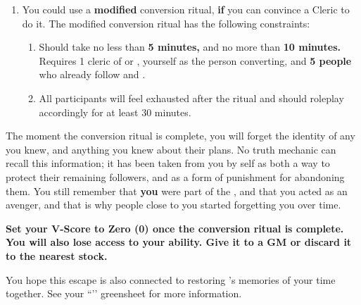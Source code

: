 \documentclass[green]{GL2020}
\begin{document}
\begin{enumerate}
\begin{enumerate}
\begin{enumerate}
    \end{enumerate}
    \item You could use a \textbf{modified} conversion ritual, \textbf{if} you can convince a Cleric to do it. The modified conversion ritual has the following constraints:
    \begin{enumerate}
      \item Should take no less than \textbf{5 minutes,} and no more than \textbf{10 minutes.} Requires 1 cleric of \cEbb{} or \cFlow{}, yourself as the person converting, and \textbf{5 people} who already follow \cEbb{} and \cFlow{}.
      \item All participants will feel exhausted after the ritual and should roleplay accordingly for at least 30 minutes.
    \end{enumerate}
  \end{enumerate}
\end{enumerate}

The moment the conversion ritual is complete, you will forget the identity of any \pGoaties{} you knew, and anything you knew about their plans. No truth mechanic can recall this information; it has been taken from you by \cGenesis{} \cGenesis{\them}self as both a way to protect their remaining followers, and as a form of punishment for abandoning them. You still remember that \textbf{you} were part of the \pGoaties{}, and that you acted as an avenger, and that is why people close to you started forgetting you over time. 

\textbf{Set your V-Score to Zero (0) once the conversion ritual is complete. You will also lose access to your \aLuck{} ability. Give it to a GM or discard it to the nearest stock.}

You hope this escape is also connected to restoring \cHeadScientist{}’s memories of your time together. See your ``\gRestoringLove{}’’ greensheet for more information.
\end{document}
